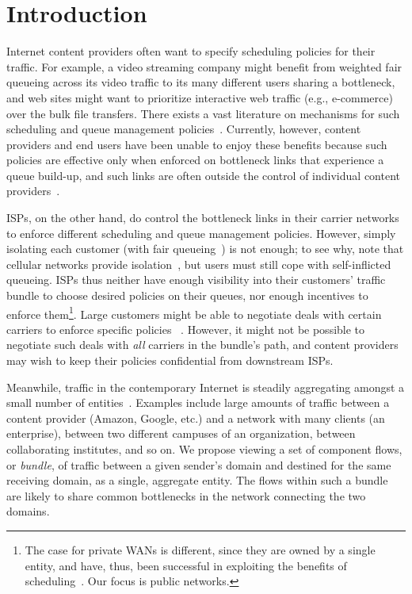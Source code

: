 \section{Introduction}\label{s:intro}

Internet content providers often want to specify scheduling policies for their traffic. 
For example, a video streaming company might benefit from weighted fair queueing across its video traffic to its many different users sharing a bottleneck, and web sites might want to prioritize interactive web traffic (e.g., e-commerce) over the bulk file transfers. 
There exists a vast literature on mechanisms for such scheduling and queue management policies~\cite{diffserv, fair-queueing, sfq, pie, CoDel, fifoplus, virtualClocks, csfq, drr, red, ecn}.
Currently, however, content providers and end users have been unable to enjoy these benefits because such policies are effective only when enforced on bottleneck links that experience a queue build-up, and such links are often outside the control of individual content 
providers~\cite{inferring-interdomain-congestion, isp-throttle-1, isp-throttle-2, isp-throttle-3}. 

ISPs, on the other hand, do control the bottleneck links in their carrier networks to enforce different scheduling and queue management policies. 
However, simply isolating each customer (\eg with fair queueing~\cite{fair-queueing}) is not enough; to see why, note that cellular networks provide isolation~\cite{sprout}, but users must still cope with self-inflicted queueing.
ISPs thus neither have enough visibility into their customers' traffic bundle to choose desired policies on their queues, nor enough incentives to enforce them\footnote{The case for private WANs is different, since they are owned by a single entity, and have, thus, been successful in exploiting the benefits of scheduling~\cite{swan, b4, bwe}. Our focus is public networks.}.
Large customers might be able to negotiate deals with certain carriers to enforce specific policies~\cite{att-qos} . 
However, it might not be possible to negotiate such deals with \emph{all} carriers in the bundle's path, and content providers may wish to keep their policies confidential from downstream ISPs.

Meanwhile, traffic in the contemporary Internet is steadily aggregating amongst a small number of entities~\cite{fivecomps}. 
Examples include large amounts of traffic between a content provider (\eg Amazon, Google, etc.) and a network with many clients (\eg an enterprise), between two different campuses of an organization, between collaborating institutes, and so on.
We propose viewing a set of component flows, or \emph{bundle}, of traffic between a given sender's domain and destined for the same receiving domain, as a single, aggregate entity.
The flows within such a bundle are likely to share common bottlenecks in the network connecting the two domains.

